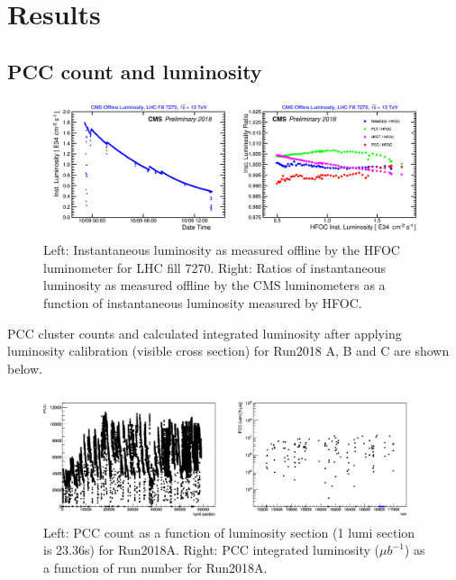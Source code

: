 \section{Results}
\label{sec:results}

\subsection{PCC count and luminosity}

\begin{figure}[H]
  \centering
  \includegraphics[width=1\columnwidth]{./lhcfill_t.png}
  \caption{Left: Instantaneous luminosity as measured offline by the HFOC luminometer for LHC fill 7270. Right: Ratios of instantaneous luminosity as measured offline by the CMS luminometers as a function of instantaneous luminosity measured by HFOC.}
  \label{fig:CMS}
\end{figure}

PCC cluster counts and calculated integrated luminosity after applying luminosity calibration (visible cross section) for Run2018 A, B and C are shown below.

 \begin{figure}[H]
  \centering
  \includegraphics[width=1\columnwidth]{./lumiA_merged.png}
  \caption{Left: PCC count as a function of luminosity section (1 lumi section is 23.36s) for Run2018A. Right: PCC integrated luminosity ($\mu b^{-1}$) as a function of run number for Run2018A.}
  \label{fig:CMS}
\end{figure}


